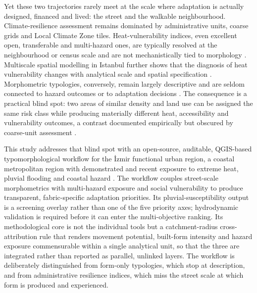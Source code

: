 Yet these two trajectories rarely meet at the scale where adaptation is actually
designed, financed and lived: the street and the walkable neighbourhood.
Climate-resilience assessment remains dominated by administrative units, coarse
grids and Local Climate Zone tiles. Heat-vulnerability indices, even excellent
open, transferable and multi-hazard ones, are typically resolved at the neighbourhood
or census scale and are not mechanistically tied to morphology
\citep{turner2025Guhvi, rupp2026WhereHeat}. Multiscale spatial modelling in
Istanbul further shows that the diagnosis of heat vulnerability changes with
analytical scale and spatial specification \citep{eminoglu2026Diagnosing}.
Morphometric typologies, conversely, remain largely descriptive and are seldom
connected to hazard outcomes or to adaptation decisions
\citep{araldi2025MultiLevel, debray2025UniversalPatterns}.
The consequence is a practical blind spot: two areas of similar density and land
use can be assigned the same risk class while producing materially different heat,
accessibility and vulnerability outcomes, a contrast documented empirically but
obscured by coarse-unit assessment \citep{wangZ2025MarginalInteraction,
iqbal2025HeatStress}.

This study addresses that blind spot with an open-source, auditable, QGIS-based
typomorphological workflow for the \.{I}zmir functional urban region, a coastal
metropolitan region with demonstrated and recent exposure to extreme heat,
pluvial flooding and coastal hazard \citep{canguzel2024ClimateChange}. The
workflow couples street-scale morphometrics with multi-hazard exposure and social
vulnerability to produce transparent, fabric-specific adaptation priorities. Its
pluvial-susceptibility output is a screening overlay rather than one of the five
priority axes; hydrodynamic validation is required before it can enter the
multi-objective ranking. Its
methodological core is not the individual tools but a catchment-radius
cross-attribution rule that renders movement potential, built-form intensity and
hazard exposure commensurable within a single analytical unit, so that the three
are integrated rather than reported as parallel, unlinked layers. The workflow is
deliberately distinguished from form-only typologies, which stop at description,
and from administrative resilience indices, which miss the street scale at which
form is produced and experienced.

